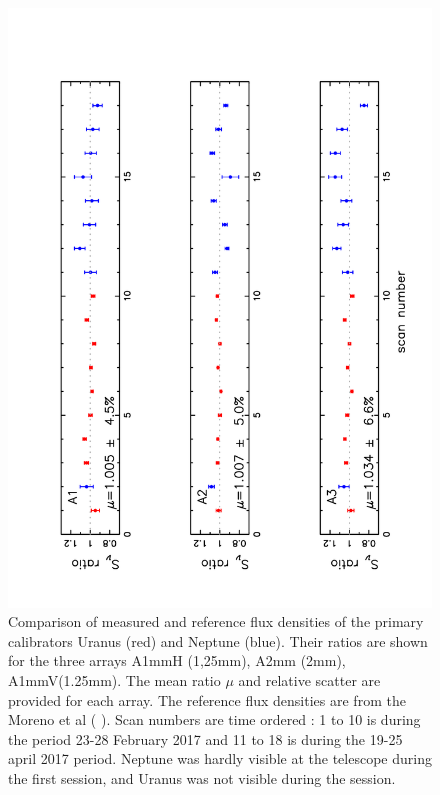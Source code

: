 \documentclass[]{aa} %
\begin{document}
\begin{figure}[h]
   \centering
    \includegraphics[angle=270,width=1.0\linewidth]{Ura_Nept_r9_10.pdf}     
    \caption{Comparison of  measured and reference flux densities of the primary calibrators Uranus (red) and Neptune (blue).
       Their ratios are shown for the three arrays A1mmH (1,25mm), A2mm (2mm), A1mmV(1.25mm).
      The mean ratio $\mu$ and relative scatter are provided for each array. The reference flux densities are from the Moreno et al ( ). 
      Scan numbers are time ordered : 1 to 10 is during the period 23-28 February 2017 and 11 to 18
      is during the  19-25 april 2017 period. Neptune was hardly visible at the telescope during the first session,
      and Uranus was not visible during the session.}
         \label{fig:calibaccuracy}
\end{figure}
\end{document}
